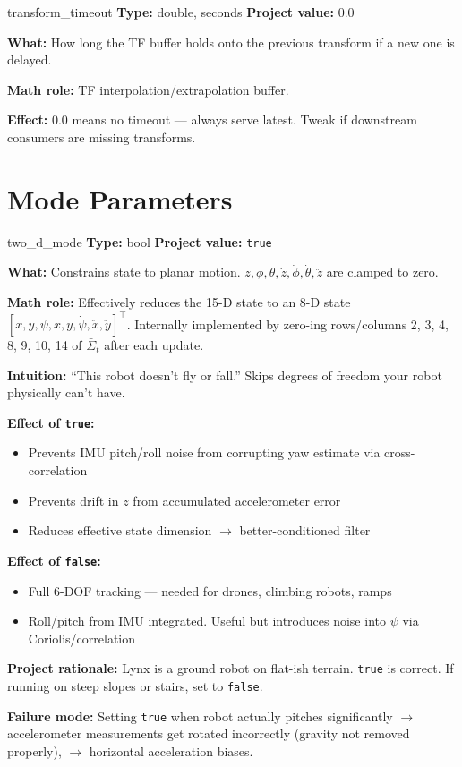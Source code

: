 \documentclass[11pt,a4paper]{article}
\begin{document}
\begin{paramcard}{transform\_timeout}
\textbf{Type:} double, seconds \quad \textbf{Project value:} 0.0

\textbf{What:} How long the TF buffer holds onto the previous transform if a new one is delayed.

\textbf{Math role:} TF interpolation/extrapolation buffer.

\textbf{Effect:} 0.0 means no timeout --- always serve latest. Tweak if downstream consumers are missing transforms.
\end{paramcard}

\section{Mode Parameters}

\begin{paramcard}{two\_d\_mode}
\textbf{Type:} bool \quad \textbf{Project value:} \texttt{true}

\textbf{What:} Constrains state to planar motion. $z, \phi, \theta, \dot{z}, \dot{\phi}, \dot{\theta}, \ddot{z}$ are clamped to zero.

\textbf{Math role:} Effectively reduces the 15-D state to an 8-D state $[x, y, \psi, \dot{x}, \dot{y}, \dot{\psi}, \ddot{x}, \ddot{y}]^\top$. Internally implemented by zero-ing rows/columns 2, 3, 4, 8, 9, 10, 14 of $\bar{\Sigma}_t$ after each update.

\textbf{Intuition:} ``This robot doesn't fly or fall.'' Skips degrees of freedom your robot physically can't have.

\textbf{Effect of \texttt{true}:}
\begin{itemize}
\item Prevents IMU pitch/roll noise from corrupting yaw estimate via cross-correlation
\item Prevents drift in $z$ from accumulated accelerometer error
\item Reduces effective state dimension $\to$ better-conditioned filter
\end{itemize}

\textbf{Effect of \texttt{false}:}
\begin{itemize}
\item Full 6-DOF tracking --- needed for drones, climbing robots, ramps
\item Roll/pitch from IMU integrated. Useful but introduces noise into $\psi$ via Coriolis/correlation
\end{itemize}

\textbf{Project rationale:} Lynx is a ground robot on flat-ish terrain. \texttt{true} is correct. If running on steep slopes or stairs, set to \texttt{false}.

\textbf{Failure mode:} Setting \texttt{true} when robot actually pitches significantly $\to$ accelerometer measurements get rotated incorrectly (gravity not removed properly), $\to$ horizontal acceleration biases.
\end{paramcard}
\end{document}
